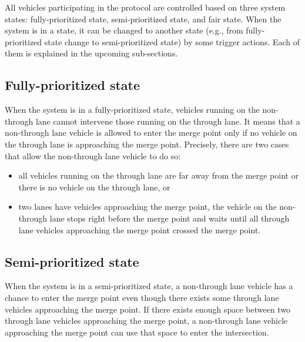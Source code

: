 \documentclass[10pt, conference, compsocconf]{IEEEtran}
\begin{document}
All vehicles participating in the protocol are controlled based on three system states: fully-prioritized state, semi-prioritized state, and fair state. 
When the system is in a state, it can be changed to another state (e.g., from fully-prioritized state change to semi-prioritized state) by some trigger actions.
Each of them is explained in the upcoming sub-sections.

\subsection{Fully-prioritized state}
When the system is in a fully-prioritized state, vehicles running on the non-through lane cannot intervene those running on the through lane. 
It means that a non-through lane vehicle is allowed to enter the merge point only if no vehicle on the through lane is approaching the merge point.
Precisely, there are two cases that allow the non-through lane vehicle to do so:
\begin{itemize}
    \item all vehicles running on the through lane are far away from the merge point or there is no vehicle on the through lane, or
    \item two lanes have vehicles approaching the merge point, the vehicle on the non-through lane stops right before the merge point and waits until all through lane vehicles approaching the merge point crossed the merge point. 
\end{itemize}




\subsection{Semi-prioritized state}
\label{semi-case}
When the system is in a semi-prioritized state, a non-through lane vehicle has a chance to enter the merge point even though there exists some through lane vehicles approaching the merge point. 
If there exists enough space between two through lane vehicles approaching the merge point, a non-through lane vehicle approaching the merge point can use that space to enter the intersection.
\end{document}
